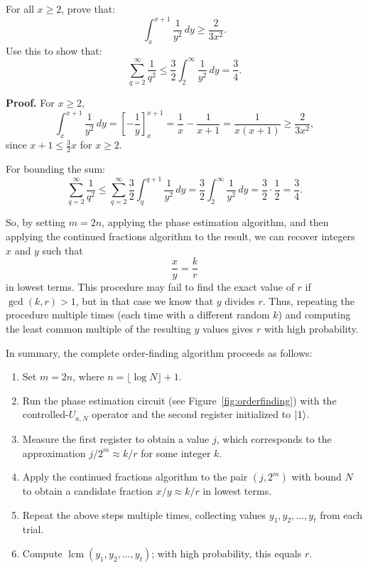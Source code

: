 \begin{example}
    For all $x \geq 2$, prove that:
    \[
    \int_x^{x+1} \frac{1}{y^2} \, dy \geq \frac{2}{3x^2}.
    \]
    Use this to show that:
    \[
    \sum_{q=2}^{\infty} \frac{1}{q^2} \leq \frac{3}{2} \int_2^{\infty} \frac{1}{y^2} \, dy = \frac{3}{4}.
    \]

    \textbf{Proof.} For $x \geq 2$,
    \[
    \int_x^{x+1} \frac{1}{y^2} \, dy = \left[ -\frac{1}{y} \right]_x^{x+1} = \frac{1}{x} - \frac{1}{x+1} = \frac{1}{x(x+1)} \geq \frac{2}{3x^2},
    \]
    since $x+1 \leq \frac{3}{2}x$ for $x \geq 2$.

    For bounding the sum:
    \[
    \sum_{q=2}^{\infty} \frac{1}{q^2} \leq \sum_{q=2}^{\infty} \frac{3}{2} \int_q^{q+1} \frac{1}{y^2} \, dy = \frac{3}{2} \int_2^{\infty} \frac{1}{y^2} \, dy = \frac{3}{2} \cdot \frac{1}{2} = \frac{3}{4}.
    \]
\end{example}

So, by setting $m = 2n$, applying the phase estimation algorithm, and then applying the continued fractions algorithm to the result, we can recover integers $x$ and $y$ such that
\[
\frac{x}{y} = \frac{k}{r}
\]
in lowest terms. This procedure may fail to find the exact value of $r$ if $\gcd(k, r) > 1$, but in that case we know that $y$ divides $r$. Thus, repeating the procedure multiple times (each time with a different random $k$) and computing the least common multiple of the resulting $y$ values gives $r$ with high probability.

\medskip

In summary, the complete order-finding algorithm proceeds as follows:

\begin{enumerate}
    \item Set $m = 2n$, where $n = \lfloor \log N \rfloor + 1$.
    
    \item Run the phase estimation circuit (see Figure~\ref{fig:orderfinding}) with the controlled-$U_{a,N}$ operator and the second register initialized to $\ket{1}$.
    
    \item Measure the first register to obtain a value $j$, which corresponds to the approximation $j/2^m \approx k/r$ for some integer $k$.
    
    \item Apply the continued fractions algorithm to the pair $(j, 2^m)$ with bound $N$ to obtain a candidate fraction $x/y \approx k/r$ in lowest terms.
    
    \item Repeat the above steps multiple times, collecting values $y_1, y_2, \ldots, y_t$ from each trial.
    
    \item Compute $\operatorname{lcm}(y_1, y_2, \ldots, y_t)$; with high probability, this equals $r$.
\end{enumerate}

